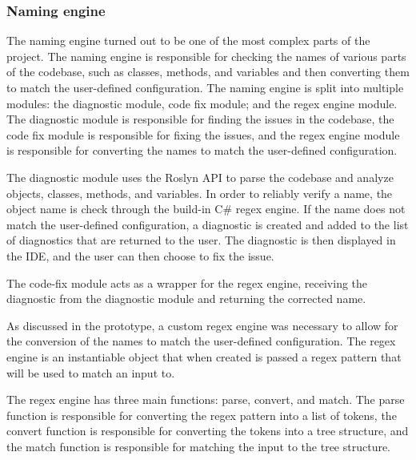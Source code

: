 \subsubsection{Naming engine}

The naming engine turned out to be one of the most complex parts of the project. The naming engine is responsible for checking the names of various parts of the codebase, such as classes, methods, and variables and then converting them to match the user-defined configuration. The naming engine is split into multiple modules: the diagnostic module, code fix module; and the regex engine module. The diagnostic module is responsible for finding the issues in the codebase, the code fix module is responsible for fixing the issues, and the regex engine module is responsible for converting the names to match the user-defined configuration.

The diagnostic module uses the Roslyn API to parse the codebase and analyze objects, classes, methods, and variables. In order to reliably verify a name, the object name is check through the build-in C\# regex engine. If the name does not match the user-defined configuration, a diagnostic is created and added to the list of diagnostics that are returned to the user. The diagnostic is then displayed in the IDE, and the user can then choose to fix the issue.

The code-fix module acts as a wrapper for the regex engine, receiving the diagnostic from the diagnostic module and returning the corrected name.

As discussed in the prototype, a custom regex engine was necessary to allow for the conversion of the names to match the user-defined configuration. The regex engine is an instantiable object that when created is passed a regex pattern that will be used to match an input to.

The regex engine has three main functions: parse, convert, and match. The parse function is responsible for converting the regex pattern into a list of tokens, the convert function is responsible for converting the tokens into a tree structure, and the match function is responsible for matching the input to the tree structure.

